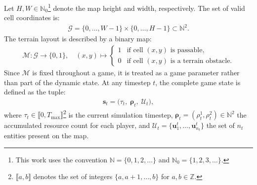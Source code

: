 Let $H, W \in \mathbb{N}_0$\footnote{This work uses the convention $\mathbb{N} = \{0, 1, 2, \ldots\}$ and $\mathbb{N}_0 = \{1, 2, 3, \ldots\}$.} denote the map height and width, respectively. The set of valid cell coordinates is:
\begin{align}
\mathcal{G} = \{0, \dots, W-1\} \times \{0, \dots, H-1\} \subset \mathbb{N}^2.
\end{align}
The terrain layout is described by a binary map:
\begin{align}
\mathcal{M}: \mathcal{G} \to \{0, 1\}, \quad (x,y) \mapsto 
\begin{cases} 
1 & \text{if cell } (x,y) \text{ is passable,} \\ 
0 & \text{if cell } (x,y) \text{ is a terrain obstacle.}
\end{cases}
\end{align}
Since $\mathcal{M}$ is fixed throughout a game, it is treated as a game parameter rather than part of the dynamic state.
At any timestep $t$, the complete game state is defined as the tuple:
\begin{align}
\boldsymbol{s}_t =
\bigl(
    \tau_t,\;
    \boldsymbol{\rho}_t,\;
    \mathcal{U}_t
\bigr),
\label{eq:tuple_state}
\end{align}
where $\tau_t \in \llbracket 0, T_{\max} \rrbracket$\footnote{$\llbracket a, b \rrbracket$ denotes the set of integers $\{a, a+1, \ldots, b\}$ for $a, b \in \mathbb{Z}$.} is the current simulation timestep, $\boldsymbol{\rho}_t = (\rho_t^1, \rho_t^2) \in \mathbb{N}^2$ the accumulated resource count for each player, and $\mathcal{U}_t = \{\mathbf{u}^{t}_1, \dots, \mathbf{u}^{t}_{n_t}\}$ the set of $n_t$ entities present on the map.

